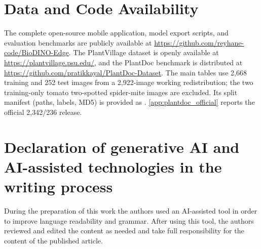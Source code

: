 \documentclass[preprint,12pt]{elsarticle}
\begin{document}
\section*{Data and Code Availability}
The complete open-source mobile application, model export scripts, and evaluation benchmarks are publicly available at \url{https://github.com/reyhane-code/BioDINO-Edge}. The PlantVillage dataset is openly available at \url{https://plantvillage.psu.edu/}, and the PlantDoc benchmark is distributed at \url{https://github.com/pratikkayal/PlantDoc-Dataset}. The main tables use 2{,}668 training and 252 test images from a 2{,}922-image working redistribution; the two training-only tomato two-spotted spider-mite images are excluded. Its split manifest (paths, labels, MD5) is provided as . \ref{app:plantdoc_official} reports the official 2{,}342/236 release.

\section*{Declaration of generative AI and AI-assisted technologies in the writing process}
During the preparation of this work the authors used an AI-assisted tool in order to improve language readability and grammar. After using this tool, the authors reviewed and edited the content as needed and take full responsibility for the content of the published article.




\end{document}
